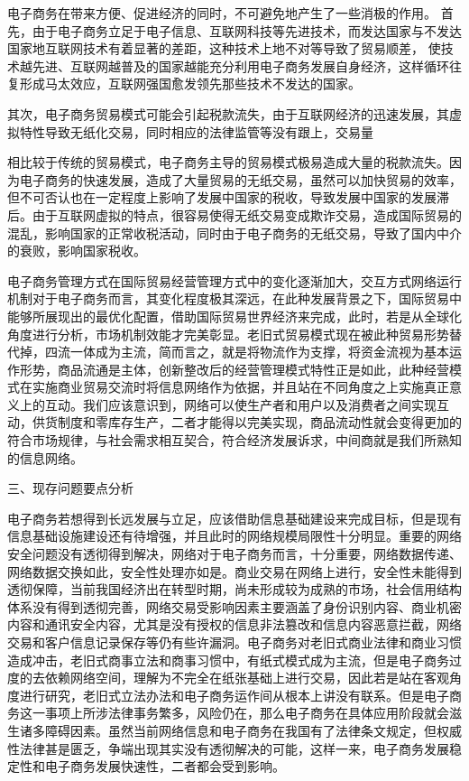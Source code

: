 电子商务在带来方便、促进经济的同时，不可避免地产生了一些消极的作用。
首先，由于电子商务立足于电子信息、互联网科技等先进技术，而发达国家与不发达国家地互联网技术有着显著的差距，这种技术上地不对等导致了贸易顺差，
使技术越先进、互联网越普及的国家越能充分利用电子商务发展自身经济，这样循环往复形成马太效应，互联网强国愈发领先那些技术不发达的国家。

其次，电子商务贸易模式可能会引起税款流失，由于互联网经济的迅速发展，其虚拟特性导致无纸化交易，同时相应的法律监管等没有跟上，交易量

相比较于传统的贸易模式，电子商务主导的贸易模式极易造成大量的税款流失。因为电子商务的快速发展，造成了大量贸易的无纸交易，虽然可以加快贸易的效率，但不可否认也在一定程度上影响了发展中国家的税收，导致发展中国家的发展滞后。由于互联网虚拟的特点，很容易使得无纸交易变成欺诈交易，造成国际贸易的混乱，影响国家的正常收税活动，同时由于电子商务的无纸交易，导致了国内中介的衰败，影响国家税收。 




电子商务管理方式在国际贸易经营管理方式中的变化逐渐加大，交互方式网络运行机制对于电子商务而言，其变化程度极其深远，在此种发展背景之下，国际贸易中能够所展现出的最优化配置，借助国际贸易世界经济来完成，此时，若是从全球化角度进行分析，市场机制效能才完美彰显。老旧式贸易模式现在被此种贸易形势替代掉，四流一体成为主流，简而言之，就是将物流作为支撑，将资金流视为基本运作形势，商品流通是主体，创新整改后的经营管理模式特性正是如此，此种经营模式在实施商业贸易交流时将信息网络作为依据，并且站在不同角度之上实施真正意义上的互动。我们应该意识到，网络可以使生产者和用户以及消费者之间实现互动，供货制度和零库存生产，二者才能得以完美实现，商品流动性就会变得更加的符合市场规律，与社会需求相互契合，符合经济发展诉求，中间商就是我们所熟知的信息网络。

三、现存问题要点分析

电子商务若想得到长远发展与立足，应该借助信息基础建设来完成目标，但是现有信息基础设施建设还有待增强，并且此时的网络规模局限性十分明显。重要的网络安全问题没有透彻得到解决，网络对于电子商务而言，十分重要，网络数据传递、网络数据交换如此，安全性处理亦如是。商业交易在网络上进行，安全性未能得到透彻保障，当前我国经济出在转型时期，尚未形成较为成熟的市场，社会信用结构体系没有得到透彻完善，网络交易受影响因素主要涵盖了身份识别内容、商业机密内容和通讯安全内容，尤其是没有授权的信息非法篡改和信息内容恶意拦截，网络交易和客户信息记录保存等仍有些许漏洞。电子商务对老旧式商业法律和商业习惯造成冲击，老旧式商事立法和商事习惯中，有纸式模式成为主流，但是电子商务过度的去依赖网络空间，理解为不完全在纸张基础上进行交易，因此若是站在客观角度进行研究，老旧式立法办法和电子商务运作间从根本上讲没有联系。但是电子商务这一事项上所涉法律事务繁多，风险仍在，那么电子商务在具体应用阶段就会滋生诸多障碍因素。虽然当前网络信息和电子商务在我国有了法律条文规定，但权威性法律甚是匮乏，争端出现其实没有透彻解决的可能，这样一来，电子商务发展稳定性和电子商务发展快速性，二者都会受到影响。

